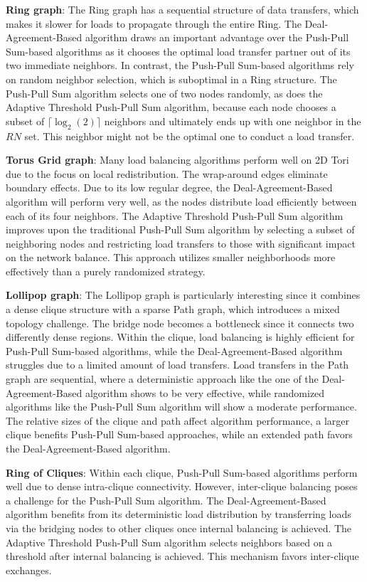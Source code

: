 \textbf{Ring graph}: The Ring graph has a sequential structure of data transfers, which makes it slower for loads to propagate through the entire Ring. The Deal-Agreement-Based algorithm draws an important advantage over the Push-Pull Sum-based algorithms as it chooses the optimal load transfer partner out of its two immediate neighbors. In contrast, the Push-Pull Sum-based algorithms rely on random neighbor selection, which is suboptimal in a Ring structure. The Push-Pull Sum algorithm selects one of two nodes randomly, as does the Adaptive Threshold Push-Pull Sum algorithm, because each node chooses a subset of $\lceil \log_{2}{(2)} \rceil$ neighbors and ultimately ends up with one neighbor in the $RN$ set. This neighbor might not be the optimal one to conduct a load transfer.

\textbf{Torus Grid graph}: Many load balancing algorithms perform well on 2D Tori due to the focus on local redistribution. The wrap-around edges eliminate boundary effects. Due to its low regular degree, the Deal-Agreement-Based algorithm will perform very well, as the nodes distribute load efficiently between each of its four neighbors. The Adaptive Threshold Push-Pull Sum algorithm improves upon the traditional Push-Pull Sum algorithm by selecting a subset of neighboring nodes and restricting load transfers to those with significant impact on the network balance. This approach utilizes smaller neighborhoods more effectively than a purely randomized strategy.

\textbf{Lollipop graph}: The Lollipop graph is particularly interesting since it combines a dense clique structure with a sparse Path graph, which introduces a mixed topology challenge. The bridge node becomes a bottleneck since it connects two differently dense regions. Within the clique, load balancing is highly efficient for Push-Pull Sum-based algorithms, while the Deal-Agreement-Based algorithm struggles due to a limited amount of load transfers. Load transfers in the Path graph are sequential, where a deterministic approach like the one of the Deal-Agreement-Based algorithm shows to be very effective, while randomized algorithms like the Push-Pull Sum algorithm will show a moderate performance. The relative sizes of the clique and path affect algorithm performance, a larger clique benefits Push-Pull Sum-based approaches, while an extended path favors the Deal-Agreement-Based algorithm.

\textbf{Ring of Cliques}: Within each clique, Push-Pull Sum-based algorithms perform well due to dense intra-clique connectivity. However, inter-clique balancing poses a challenge for the Push-Pull Sum algorithm. The Deal-Agreement-Based algorithm benefits from its deterministic load distribution by transferring loads via the bridging nodes to other cliques once internal balancing is achieved. The Adaptive Threshold Push-Pull Sum algorithm selects neighbors based on a threshold after internal balancing is achieved. This mechanism favors inter-clique exchanges.